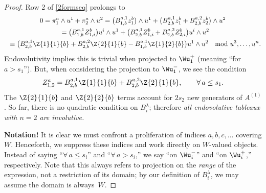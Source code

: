 \begin{proof}
Row 2 of \eqref{2formseq} prolongs to
\begin{gather*}
0 = \pi^a_1 \wedge u^1 + \pi^a_2 \wedge u^2
  =
    \big( B^{a,1}_{1,b} z^b_1 \big)\wedge u^1
   +\big( B^{a,1}_{2,b} z^b_1
         + B^{a,2}_{2,b} z^b_2 \big)\wedge u^2\\
\hphantom{0}{} =
    \big( B^{a,1}_{1,b} Z^b_{1,i} \big)u^i\wedge u^1
   +\big( B^{a,1}_{2,b} Z^b_{1,i}
         + B^{a,2}_{2,b} Z^b_{2,i} \big)u^i\wedge u^2\\
\hphantom{0}{}
\equiv
    \big( B^{a,1}_{2,b} \Z{1}{1}{b}
         + B^{a,2}_{2,b} \Z{2}{1}{b}
         - B^{a,1}_{1,b} \Z{1}{2}{b}
         \big)u^1\wedge u^2 \ \mod u^3, \ldots, u^n.
\end{gather*}
Endovolutivity implies this is trivial when projected to $\Wu^+_1$ (meaning
``for $a > s_1$''). But, when considering the projection to $\Wu^-_1$, we see
the condition
\begin{gather*}
Z^a_{1,2} =  B^{a,1}_{2,b}\Z{1}{1}{b} +
B^{a,2}_{2,b}\Z{2}{1}{b},\qquad \forall\, a \leq s_1.
\end{gather*}
The $\Z{2}{1}{b}$ and $\Z{2}{2}{b}$ terms account for
$2s_2$ new generators of $A^{(1)}$.  So far, there is no quadratic condition on
$B^\lambda_i$; therefore \emph{all endovolutive tableaux with $n=2$ are
involutive.}

\textbf{Notation!}  It is clear we must confront a proliferation of indices
$a,b,c,\ldots$ covering $W$.  Henceforth, we suppress these indices and work
directly on $W$-valued objects.  Instead of saying ``$\forall\,
a\leq s_i$'' and ``$\forall\, a > s_i$,'' we say ``on $\Wu^-_i$'' and ``on
$\Wu^+_i$,'' respectively.  Note that this always refers to
projection on the \emph{range} of the expression, not a restriction of its
domain; by our def\/inition of $B^\lambda_i$, we may assume the domain is always~$W$.


\end{proof}
